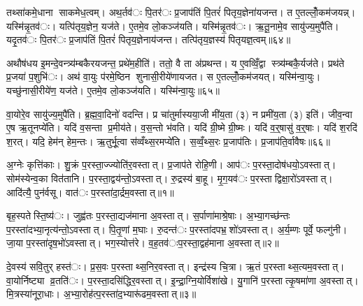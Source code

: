 तथ्सा॑कमे॒धाना साकमेध॒त्वम्। अथ॒र्तव॑ः पि॒तर॑ः प्र॒जाप॑तिं पि॒तरं॑ पितृय॒ज्ञेना॑यजन्त। त ए॒तल्लोँ॒कम॑जयन्न्। यस्मि॑न्नृ॒तव॑ः। यत्पि॑तृय॒ज्ञेन॒ यज॑ते। ए॒तमे॒व लो॒कञ्ज॑यति। यस्मि॑न्नृ॒तव॑ः। ऋ॒तू॒नामे॒व सायु॑ज्य॒मुपै॑ति। यदृ॒तव॑ः पि॒तर॑ः प्र॒जाप॑तिं पि॒तरं॑ पितृय॒ज्ञेनाय॑जन्त। तत्पि॑तृय॒ज्ञस्य॑ पितृयज्ञ॒त्वम्॥६४॥

अथौष॑धय इ॒मन्दे॒वन्त्र्य॑म्बकैरयजन्त॒ प्रथे॑म॒हीति॑। ततो॒ वै ता अ॑प्रथन्त। य ए॒वव्विँ॒द्वा स्त्र्य॑म्बकै॒र्यज॑ते। प्रथ॑ते प्र॒जया॑ प॒शुभि॑ः। अथ॑ वा॒युः प॑रमे॒ष्ठिन शुनासी॒रीये॑णायजत। स ए॒तल्लोँ॒कम॑जयत्। यस्मि॑न्वा॒युः। यच्छु॑नासी॒रीये॑ण॒ यज॑ते। ए॒तमे॒व लो॒कञ्ज॑यति। यस्मि॑न्वा॒युः॥६५॥

वा॒योरे॒व सायु॑ज्य॒मुपै॑ति। ब्र॒ह्म॒वा॒दिनो॑ वदन्ति। प्र चा॑तुर्मास्यया॒जी मी॑य॒ता (३) न प्रमी॑य॒ता (३) इति॑। जीव॒न्वा ए॒ष ऋ॒तूनप्ये॑ति। यदि॑ व॒सन्ता प्र॒मीय॑ते। व॒स॒न्तो भ॑वति। यदि॑ ग्री॒ष्मे ग्री॒ष्मः। यदि॑ व॒र्॒षासु॑ व॒र्॒षाः। यदि॑ श॒रदि॑ श॒रत्। यदि॒ हेम॑न् हेम॒न्तः। ऋ॒तुर्भू॒त्वा स॑व्वँथ्स॒रमप्ये॑ति। स॒व्वँ॒थ्स॒रः प्र॒जाप॑तिः। प्र॒जाप॑ति॒र्वावैषः॥६६॥




अ॒ग्नेः कृत्ति॑काः। शु॒क्रं प॒रस्ता॒ज्ज्योति॑र॒वस्तात्। प्र॒जाप॑ते रोहि॒णी। आप॑ः प॒रस्ता॒दोष॑धयो॒ऽवस्तात्। सोम॑स्येन्व॒का वित॑तानि। प॒रस्ता॒द्वय॑न्तो॒ऽवस्तात्। रु॒द्रस्य॑ बा॒हू। मृ॒ग॒यव॑ः प॒रस्ताद्विक्षा॒रो॑ऽवस्तात्। आदि॑त्यै॒ पुन॑र्वसू। वात॑ः प॒रस्ता॑दा॒र्द्रम॒वस्तात्॥१॥

बृह॒स्पतेस्ति॒ष्य॑ः। जुह्व॑तः प॒रस्ता॒द्यज॑माना अ॒वस्तात्। स॒र्पाणा॑माश्रे॒षाः। अ॒भ्या॒गच्छ॑न्तः प॒रस्ता॑दभ्या॒नृत्य॑न्तो॒ऽवस्तात्। पि॒तृ॒णां म॒घाः। रु॒दन्त॑ः प॒रस्ता॑दपभ्र॒शो॑ऽवस्तात्। अ॒र्य॒म्णः पूर्वे॒ फल्गु॑नी। जा॒या प॒रस्ता॑दृष॒भो॑ऽवस्तात्। भग॒स्योत्त॑रे। व॒ह॒तव॑ःप॒रस्ता॒द्वह॑माना अ॒वस्तात्॥२॥

दे॒वस्य॑ सवि॒तुर् हस्त॑ः। प्र॒स॒वः प॒रस्ताथ्स॒निर॒वस्तात्। इन्द्र॑स्य चि॒त्रा। ऋ॒तं प॒रस्ताथ्स॒त्यम॒वस्तात्। वा॒योर्निष्ट्या व्र॒तति॑ः। प॒रस्ता॒दसि॑द्धिर॒वस्तात्। इ॒न्द्रा॒ग्नि॒योर्विशा॑खे। यु॒गानि॑ प॒रस्तात्कृ॒षमा॑णा अ॒वस्तात्। मि॒त्रस्या॑नूरा॒धाः। अ॒भ्या॒रोह॑त्प॒रस्ता॑द॒भ्यारू॑ढम॒वस्तात्॥३॥

